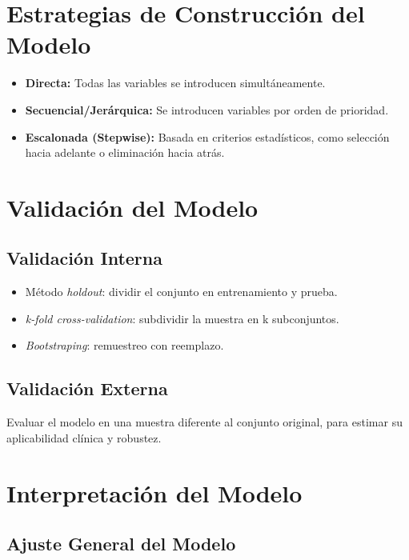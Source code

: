 \documentclass[12pt]{article}
\begin{document}
\section{Estrategias de Construcción del Modelo}

\begin{itemize}
  \item \textbf{Directa:} Todas las variables se introducen simultáneamente.
  \item \textbf{Secuencial/Jerárquica:} Se introducen variables por orden de prioridad.
  \item \textbf{Escalonada (Stepwise):} Basada en criterios estadísticos, como selección hacia adelante o eliminación hacia atrás.
\end{itemize}

\section{Validación del Modelo}

\subsection{Validación Interna}

\begin{itemize}
  \item Método \textit{holdout}: dividir el conjunto en entrenamiento y prueba.
  \item \textit{k-fold cross-validation}: subdividir la muestra en k subconjuntos.
  \item \textit{Bootstraping}: remuestreo con reemplazo.
\end{itemize}

\subsection{Validación Externa}

Evaluar el modelo en una muestra diferente al conjunto original, para estimar su aplicabilidad clínica y robustez.

\section{Interpretación del Modelo}

\subsection{Ajuste General del Modelo}
\end{document}
